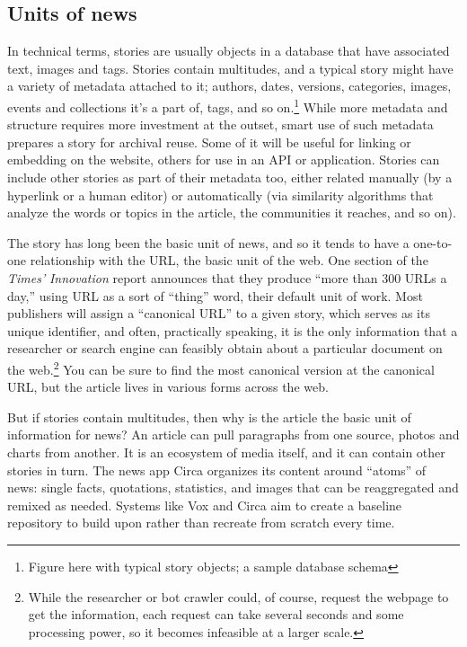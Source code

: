 \subsection{Units of news}

In technical terms, stories are usually objects in a database that have associated text, images and tags. Stories contain multitudes, and a typical story might have a variety of metadata attached to it; authors, dates, versions, categories, images, events and collections it's a part of, tags, and so on.\footnote{Figure here with typical story objects; a sample database schema} While more metadata and structure requires more investment at the outset, smart use of such metadata prepares a story for archival reuse. Some of it will be useful for linking or embedding on the website, others for use in an API or application. Stories can include other stories as part of their metadata too, either related manually (by a hyperlink or a human editor) or automatically (via similarity algorithms that analyze the words or topics in the article, the communities it reaches, and so on).

The story has long been the basic unit of news, and so it tends to have a one-to-one relationship with the URL, the basic unit of the web. One section of the \emph{Times'} \emph{Innovation} report announces that they produce ``more than 300 URLs a day,'' using URL as a sort of ``thing'' word, their default unit of work.\autocite[27]{_innovation_2014} Most publishers will assign a ``canonical URL'' to a given story, which serves as its unique identifier, and often, practically speaking, it is the only information that a researcher or search engine can feasibly obtain about a particular document on the web.\footnote{While the researcher or bot crawler could, of course, request the webpage to get the information, each request can take several seconds and some processing power, so it becomes infeasible at a larger scale.} You can be sure to find the most canonical version at the canonical URL, but the article lives in various forms across the web.

But if stories contain multitudes, then why is the article the basic unit of information for news? An article can pull paragraphs from one source, photos and charts from another. It is an ecosystem of media itself, and it can contain other stories in turn. The news app Circa organizes its content around ``atoms'' of news: single facts, quotations, statistics, and images that can be reaggregated and remixed as needed. Systems like Vox and Circa aim to create a baseline repository to build upon rather than recreate from scratch every time.

